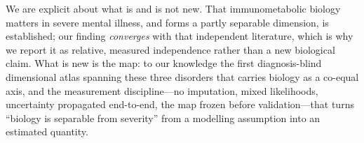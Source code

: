 We are explicit about what is and is not new. That immunometabolic biology matters in severe
mental illness, and forms a partly separable dimension, is established; our finding
\emph{converges} with that independent literature, which is why we report it as relative, measured
independence rather than a new biological claim. What is new is the map: to our knowledge the
first diagnosis-blind dimensional atlas spanning these three disorders that carries biology as a
co-equal axis, and the measurement discipline---no imputation, mixed likelihoods, uncertainty
propagated end-to-end, the map frozen before validation---that turns ``biology is separable from
severity'' from a modelling assumption into an estimated quantity.
